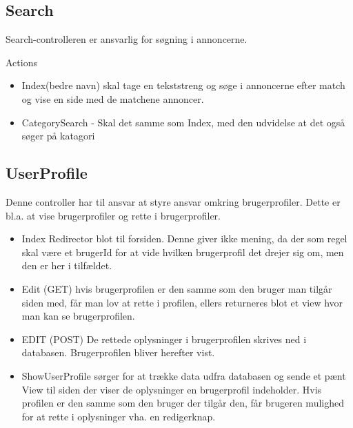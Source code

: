 %
%	


\subsection{Search}
Search-controlleren er ansvarlig for søgning i annoncerne. 

Actions 
\begin{itemize}
	\item Index(bedre navn) skal tage en tekststreng og søge i annoncerne efter match og vise en side med de matchene annoncer.
	\item CategorySearch - Skal det samme som Index, med den udvidelse at det også søger på katagori
\end{itemize}

\subsection{UserProfile}
Denne controller har til ansvar at styre ansvar omkring brugerprofiler. Dette er bl.a. at vise brugerprofiler og rette i brugerprofiler.

\begin{itemize}
	\item Index Redirector blot til forsiden. Denne giver ikke mening, da der som regel skal være et brugerId for at vide hvilken brugerprofil det drejer sig om, men den er her i tilfældet.
	\item Edit (GET) hvis brugerprofilen er den samme som den bruger man tilgår siden med, får man lov at rette i profilen, ellers returneres blot et view hvor man kan se brugerprofilen.
	\item EDIT (POST) De rettede oplysninger i brugerprofilen skrives ned i databasen. Brugerprofilen bliver herefter vist.
	\item ShowUserProfile sørger for at trække data udfra databasen og sende et pænt View til siden der viser de oplysninger en brugerprofil indeholder. Hvis profilen er den samme som den bruger der tilgår den, får brugeren mulighed for at rette i oplysninger vha. en redigerknap.
\end{itemize}
